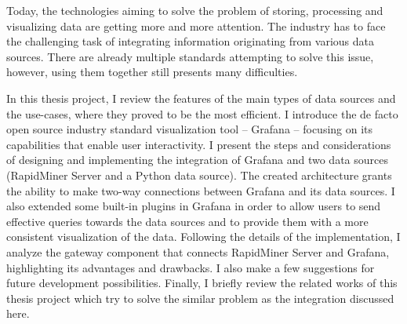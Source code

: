Today, the technologies aiming to solve the problem of storing, processing and visualizing data are getting more and more attention. The industry has to face the challenging task of integrating information originating from various data sources. There are already multiple standards attempting to solve this issue, however, using them together still presents many difficulties.

In this thesis project, I review the features of the main types of data sources and the use-cases, where they proved to be the most efficient. I introduce the de facto open source industry standard visualization tool -- Grafana -- focusing on its capabilities that enable user interactivity. I present the steps and considerations of designing and implementing the integration of Grafana and two data sources (RapidMiner Server and a Python data source). The created architecture grants the ability to make two-way connections between Grafana and its data sources. I also extended some built-in plugins in Grafana in order to allow users to send effective queries towards the data sources and to provide them with a more consistent visualization of the data. Following the details of the implementation, I analyze the gateway component that connects RapidMiner Server and Grafana, highlighting its advantages and drawbacks. I also make a few suggestions for future development possibilities. Finally, I briefly review the related works of this thesis project which try to solve the similar problem as the integration discussed here.


\vfill
\selectthesislanguage

\setcounter{romanPage}{\value{page}}
